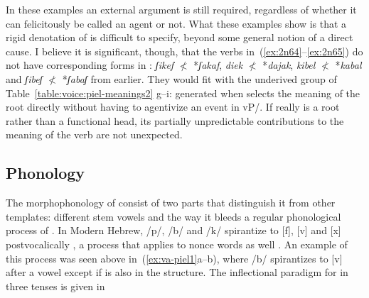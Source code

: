 \begin{exe}
\begin{xlist}
\begin{exe}
\begin{xlist}
\begin{exe}
\begin{xlist}
\begin{exe}
\begin{exe}
\begin{xlist}
\begin{exe}
\begin{xlist}
\begin{exe}
\begin{xlist}
\begin{exe}
\begin{xlist}
\begin{exe}
\begin{xlist}
\begin{exe}
\begin{xlist}
\begin{exe}
\begin{xlist}
\begin{exe}
\begin{xlist}
\begin{exe}
\begin{xlist}
\begin{exe}
\begin{xlist}
\begin{exe}
\begin{xlist}
\begin{exe}
\begin{xlist}
\begin{exe}
\begin{xlist}
\begin{exe}
\begin{exe}
\begin{xlist}
\begin{exe}
\begin{xlist}
\begin{exe}
\begin{xlist}
\begin{exe}
\begin{xlist}
{\begin{exe}
\begin{xlist}
\begin{exe}
\begin{xlist}
\begin{exe}
\begin{xlist}
\begin{exe}
\begin{xlist}
\begin{xlist}
\begin{xlist}
\begin{exe}
\begin{xlist}
\begin{xlist}
\begin{xlist}
\begin{exe}
\begin{exe}
\begin{xlist}
\begin{exe}
\begin{xlist}
\begin{exe}
\begin{xlist}
\begin{exe}
\begin{xlist}
\begin{exe}
\begin{xlist}
\begin{exe}
\begin{xlist}
\begin{exe}
\begin{xlist}
\begin{exe}
\begin{exe}
\begin{xlist}
\begin{xlist}
\begin{exe}
\begin{xlist}
\begin{exe}
\begin{xlist}
\begin{exe}
\begin{xlist}
\begin{exe}
\begin{xlist}
\begin{exe}
\begin{xlist}
\begin{exe}
\begin{xlist}
\begin{exe}
\begin{exe}
\begin{xlist}
\begin{exe}
\begin{xlist}
\begin{exe}
\begin{xlist}
\begin{exe}
\begin{xlist}
\begin{exe}
\begin{xlist}
\begin{exe}
\begin{xlist}
\begin{exe}
\begin{xlist}
In these examples an external argument is still required, regardless of whether it can felicitously be called an agent or not. What these examples show is that a rigid denotation of {\va} is difficult to specify, beyond some general notion of a direct cause. I believe it is significant, though, that the verbs in~(\ref{ex:2n64}--\ref{ex:2n65}) do not have corresponding forms in {\tkal}: \emph{ʃikef} $\nless$ *\emph{ʃakaf}, \emph{diek} $\nless$ *\emph{dajak}, \emph{kibel} $\nless$ *\emph{kabal} and \emph{ʃibeʃ} $\nless$ *\emph{ʃabaʃ} from earlier. They would fit with the underived group of Table~\ref{table:voice:piel-meanings2} g--i: generated when {\va} selects the meaning of the root directly without having to agentivize an event in vP/{\tkal}. If {\va} really is a root rather than a functional head, its partially unpredictable contributions to the meaning of the verb are not unexpected.

	\subsection{Phonology} \label{voice:va:phono}
The morphophonology of {\tpie} consist of two parts that distinguish it from other templates: different stem vowels and the way it bleeds a regular phonological process of . In Modern Hebrew, /p/, /b/ and /k/ spirantize to [f], [v] and [x] postvocalically \citep{adam02,temkinmartinez08wccfl,gouskova12nllt}, a process that applies to nonce words as well \citep{temkinmartinzemuellner16}. An example of this process was seen above in~(\ref{ex:va-piel1}a--b), where /b/ spirantizes to [v] after a vowel except if {\va} is also in the structure. The inflectional paradigm for {\tpie} in three tenses is given in 
\end{xlist}
\end{exe}
\end{xlist}
\end{exe}
\end{xlist}
\end{exe}
\end{xlist}
\end{exe}
\end{xlist}
\end{exe}
\end{xlist}
\end{exe}
\end{xlist}
\end{exe}
\end{exe}
\end{xlist}
\end{exe}
\end{xlist}
\end{exe}
\end{xlist}
\end{exe}
\end{xlist}
\end{exe}
\end{xlist}
\end{exe}
\end{xlist}
\end{exe}
\end{xlist}
\end{xlist}
\end{exe}
\end{exe}
\end{xlist}
\end{exe}
\end{xlist}
\end{exe}
\end{xlist}
\end{exe}
\end{xlist}
\end{exe}
\end{xlist}
\end{exe}
\end{xlist}
\end{exe}
\end{xlist}
\end{exe}
\end{exe}
\end{xlist}
\end{xlist}
\end{xlist}
\end{exe}
\end{xlist}
\end{xlist}
\end{xlist}
\end{exe}
\end{xlist}
\end{exe}
\end{xlist}
\end{exe}
\end{xlist}
\end{exe}}
\end{xlist}
\end{exe}
\end{xlist}
\end{exe}
\end{xlist}
\end{exe}
\end{xlist}
\end{exe}
\end{exe}
\end{xlist}
\end{exe}
\end{xlist}
\end{exe}
\end{xlist}
\end{exe}
\end{xlist}
\end{exe}
\end{xlist}
\end{exe}
\end{xlist}
\end{exe}
\end{xlist}
\end{exe}
\end{xlist}
\end{exe}
\end{xlist}
\end{exe}
\end{xlist}
\end{exe}
\end{xlist}
\end{exe}
\end{xlist}
\end{exe}
\end{xlist}
\end{exe}
\end{exe}
\end{xlist}
\end{exe}
\end{xlist}
\end{exe}
\end{xlist}
\end{exe}
